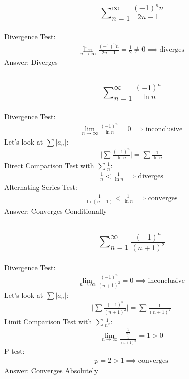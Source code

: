 \documentclass{article}
\begin{document}
\subsection{
	\begin{align*}
		\sum_{n = 1}^\infty \frac{(-1)^n n}{2n - 1}
	\end{align*}
}
Divergence Test:
\begin{align*}
	\lim_{n \to \infty} {\frac{(-1)^n n}{2n - 1}} = \frac{1}{2} \neq 0 \implies \text{diverges}
\end{align*}
Answer: Diverges

\subsection{
	\begin{align*}
		\sum_{n = 1}^\infty \frac{(-1)^n}{\ln{n}}
	\end{align*}
}
Divergence Test:
\begin{align*}
	\lim_{n \to \infty} \frac{(-1)^n}{\ln{n}} = 0 \implies \text{inconclusive}
\end{align*}
Let's look at $\sum |a_n|$:
\begin{align*}
	\bigg| \sum \frac{(-1)^n}{\ln{n}} \bigg| = \sum \frac{1}{\ln{n}}
\end{align*}
Direct Comparison Test with $\sum \frac{1}{n}$:
\begin{align*}
	\frac{1}{n} < \frac{1}{\ln{n}} \implies \text{diverges}
\end{align*}
Alternating Series Test:
\begin{align*}
	\frac{1}{\ln{(n + 1)}} < \frac{1}{\ln{n}} \implies \text{converges}
\end{align*}
Answer: Converges Conditionally

\subsection{
	\begin{align*}
		\sum_{n = 1}^\infty \frac{(-1)^n}{(n + 1)^2}
	\end{align*}
}
Divergence Test:
\begin{align*}
	\lim_{n \to \infty} \frac{(-1)^n}{(n + 1)^2} = 0 \implies \text{inconclusive}
\end{align*}
Let's look at $\sum |a_n|$:
\begin{align*}
	\bigg| \sum \frac{(-1)^n}{(n + 1)^2} \bigg| = \sum \frac{1}{(n + 1)^2}
\end{align*}
Limit Comparison Test with $\sum \frac{1}{n^2}$:
\begin{align*}
	\lim_{n \to \infty} {\frac{\frac{1}{n^2}}{\frac{1}{(n + 1)^2}}} = 1 > 0
\end{align*}
P-test:
\begin{align*}
	p = 2 > 1 \implies \text{converges}
\end{align*}
Answer: Converges Absolutely
\end{document}
